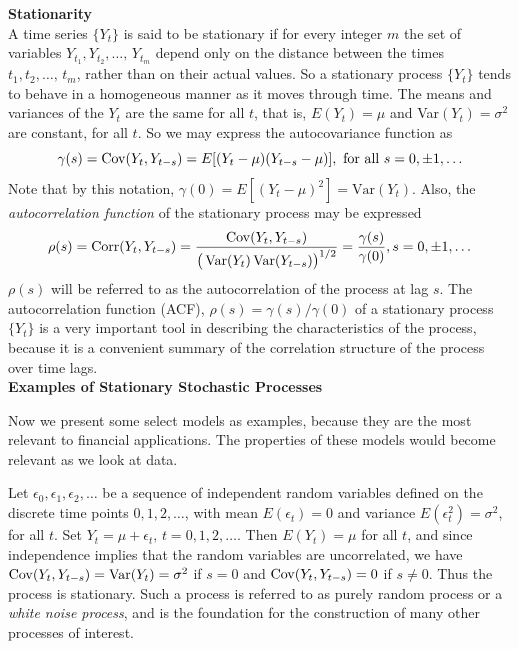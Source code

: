 \noindent \textbf{Stationarity} \\


A time series $\{Y_t\}$ is said to be stationary if for every integer $m$ the set of variables $Y_{t_1}, Y_{t_2}, \ldots, \, Y_{t_m}$ depend only on the distance between the times $t_1, t_2, \ldots, \, t_m$, rather than on their actual values.  So a stationary process $\{Y_t\}$ tends to behave in a homogeneous manner as it moves through time. The means and variances of the $Y_t$ are the same for all $t$, that is, $E\left(Y_t\right) = \mu$ and  Var$\left(Y_t\right)=\sigma^2$ are constant, for all $t$. So we may express the autocovariance function as 
	\begin{equation}\label{eqn:2gammas}
	\gamma(s)=\Cov(Y_t,Y_{t - s})=E[(Y_t-\mu)(Y_{t - s}-\mu)], \text{ for all }s=0,\pm 1, \ldots
	\end{equation}
Note that by this notation, $\gamma(0) = E[(Y_t-\mu)^2] = \text{Var}(Y_t)$. Also, the \textit{autocorrelation function} of the stationary process may be expressed
        	\begin{equation}\label{eqn:2rhos}
	\rho(s)=\Corr(Y_t,Y_{t-s})= \dfrac{\Cov(Y_t,Y_{t-s})}{\big(\Var(Y_t)\Var(Y_{t-s})\big)^{1/2}} = \dfrac{\gamma(s)}{\gamma(0)},  s=0,\pm 1,\ldots
	\end{equation}
$\rho(s)$ will be referred to as the autocorrelation of the process at lag $s$. The autocorrelation function (ACF), $\rho(s) = \gamma(s)/\gamma(0)$ of a stationary process $\{Y_t\}$ is a very important tool in describing the characteristics of the process, because it is a convenient summary of the correlation structure of the process over time lags.  \\


\noindent \textbf{Examples of Stationary Stochastic Processes} 


Now we present some select models as examples, because they are the most relevant to financial applications. The properties of these models would become relevant as we look at data. 


\begin{ex} \label{ex:whitenoise} Let $\epsilon_0, \epsilon_1,\epsilon_2, \ldots$ be a sequence of independent random variables defined on the discrete time points $0,1,2,\ldots$, with mean $E(\epsilon_{t})=0$ and variance $E(\epsilon_{t}^2)=\sigma^2$, for all $t$. Set $Y_t = \mu + \epsilon_t, \, t=0, 1, 2, \ldots$. Then $E(Y_t)=\mu$ for all $t$, and since independence implies that the random variables are uncorrelated, we have $\operatorname{Cov}(Y_t,Y_{t-s})=\operatorname{Var}(Y_t)=\sigma^2$ if $s=0$ and $\operatorname{Cov}(Y_t,Y_{t-s})=0$ if $s\neq 0$. Thus the process is stationary. Such a process is referred to as purely random process or a \textit{white noise process}, and is the foundation for the construction of many other processes of interest. 
\end{ex}


